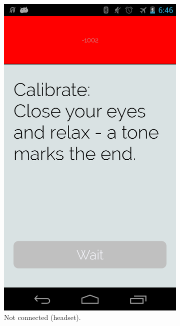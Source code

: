 \documentclass[a4paper,10pt,english,lof,lot,twoside]{puthesis}
\begin{document}
\begin{figure}
\begin{subfigure}[t]{0.30\linewidth}
\includegraphics[width=0.800\linewidth]{final-prototype-calibrate-no-connect.png}
\caption[Not connected]{Not connected (headset).}\label{ch-design/index:fig-final-prototype-app-flow-calibrate-no-connect}\end{subfigure}
\begin{subfigure}[t]{0.30\linewidth}
\centering
\capstart


\end{subfigure}
\end{figure}
\end{document}
